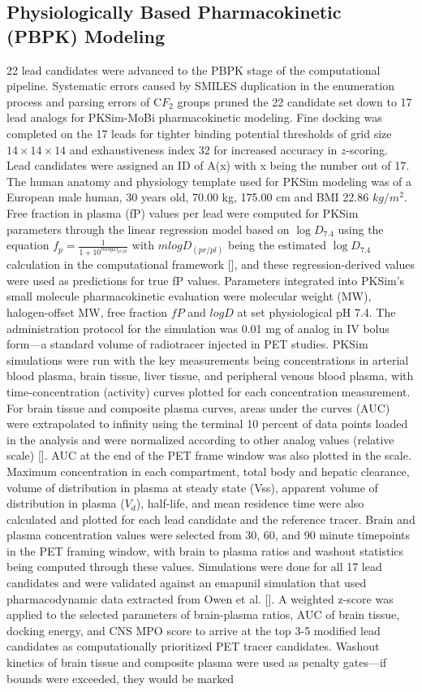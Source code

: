 \documentclass[times, twoside]{zHenriquesLab-StyleBioRxiv}
\begin{document}
		\subsection{Physiologically Based Pharmacokinetic (PBPK) Modeling }
		22 lead candidates were advanced to the PBPK stage of the computational pipeline. Systematic errors caused by SMILES duplication in the enumeration process and parsing errors of $\mathrm{C}{F}_2$ groups pruned the 22 candidate set down to 17 lead analogs for PKSim-MoBi pharmacokinetic modeling. Fine docking was completed on the 17 leads for tighter binding potential thresholds of grid size $14\times14\times14$ and exhaustiveness index 32 for increased accuracy in $z$-scoring. Lead candidates were assigned an ID of A(x) with x being the number out of 17. The human anatomy and physiology template used for PKSim modeling was of a European male human, 30 years old, 70.00 kg, 175.00 cm and BMI 22.86 $kg/m^2$. Free fraction in plasma (fP) values per lead were computed for PKSim parameters through the linear regression model based on $\log D_{7.4}$ using the equation $f_p = \frac{1}{1+10^{mlogD_{pr/pl}}}$ with $mlogD_(pr/pl)$ being the estimated $\log D_{7.4}$ calculation in the computational framework [\cite{zoghbi2012}], and these regression-derived values were used as predictions for true fP values. Parameters integrated into PKSim’s small molecule pharmacokinetic evaluation were molecular weight (MW), halogen-offset MW, free fraction $fP$ and $logD$ at set physiological pH 7.4. The administration protocol for the simulation was 0.01 mg of analog in IV bolus form—a standard volume of radiotracer injected in PET studies. PKSim simulations were run with the key measurements being concentrations in arterial blood plasma, brain tissue, liver tissue, and peripheral venous blood plasma, with time-concentration (activity) curves plotted for each concentration measurement. For brain tissue and composite plasma curves, areas under the curves (AUC) were extrapolated to infinity using the terminal 10 percent of data points loaded in the analysis and were normalized according to other analog values (relative scale) [\cite{communityn.d}]. AUC at the end of the PET frame window was also plotted in the scale. Maximum concentration in each compartment, total body and hepatic clearance, volume of distribution in plasma at steady state (Vss), apparent volume of distribution in plasma ($V_{d}$), half-life, and mean residence time were also calculated and plotted for each lead candidate and the reference tracer. Brain and plasma concentration values were selected from 30, 60, and 90 minute timepoints in the PET framing window, with brain to plasma ratios and washout statistics being computed through these values. Simulations were done for all 17 lead candidates and were validated against an emapunil simulation that used pharmacodynamic data extracted from Owen et al. [\cite{owen2022}]. A weighted z-score was applied to the selected parameters of brain-plasma ratios, AUC of brain tissue, docking energy, and CNS MPO score to arrive at the top 3-5 modified lead candidates as computationally prioritized PET tracer candidates. Washout kinetics of brain tissue and composite plasma were used as penalty gates—if bounds were exceeded, they would be marked 
\end{document}
